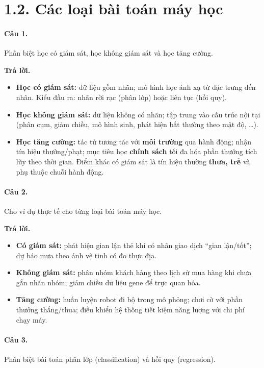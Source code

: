 \section*{1.2. Các loại bài toán máy học}

\paragraph{Câu 1.} Phân biệt học có giám sát, học không giám sát và học tăng cường.

\medskip\noindent\textbf{Trả lời.}
\begin{itemize}[nosep]
\item \textbf{Học có giám sát:} dữ liệu gồm nhãn; mô hình học ánh xạ từ đặc trưng đến nhãn. Kiểu đầu ra: nhãn rời rạc (phân lớp) hoặc liên tục (hồi quy).
\item \textbf{Học không giám sát:} dữ liệu không có nhãn; tập trung vào cấu trúc nội tại (phân cụm, giảm chiều, mô hình sinh, phát hiện bất thường theo mật độ, \ldots).
\item \textbf{Học tăng cường:} tác tử tương tác với \textbf{môi trường} qua hành động; nhận tín hiệu thưởng/phạt; mục tiêu học \textbf{chính sách} tối đa hóa phần thưởng tích lũy theo thời gian. Điểm khác có giám sát là tín hiệu thường \textbf{thưa, trễ} và phụ thuộc chuỗi hành động.
\end{itemize}

\paragraph{Câu 2.} Cho ví dụ thực tế cho từng loại bài toán máy học.

\medskip\noindent\textbf{Trả lời.}
\begin{itemize}[nosep]
\item \textbf{Có giám sát:} phát hiện gian lận thẻ khi có nhãn giao dịch ``gian lận/tốt''; dự báo mưa theo ảnh vệ tinh có đo thực địa.
\item \textbf{Không giám sát:} phân nhóm khách hàng theo lịch sử mua hàng khi chưa gắn nhãn nhóm; giảm chiều dữ liệu gene để trực quan hóa.
\item \textbf{Tăng cường:} huấn luyện robot đi bộ trong mô phỏng; chơi cờ với phần thưởng thắng/thua; điều khiển hệ thống tiết kiệm năng lượng với chi phí chạy máy.
\end{itemize}

\paragraph{Câu 3.} Phân biệt bài toán phân lớp (classification) và hồi quy (regression).

